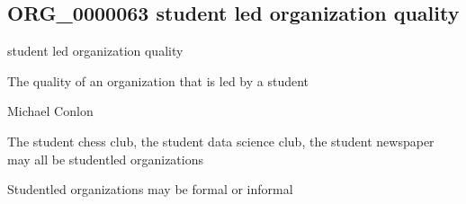 \documentclass[letterpaper,10pt,english]{sphinxmanual}
\begin{document}
\subsection{ORG\_0000063 \sphinxhyphen{} student led organization quality}
\label{\detokenize{doc-ORG_0000063:org-0000063-student-led-organization-quality}}\label{\detokenize{doc-ORG_0000063:index-0}}\label{\detokenize{doc-ORG_0000063::doc}}
\begin{sphinxShadowBox}

\sphinxAtStartPar
student led organization quality
\end{sphinxShadowBox}

\begin{sphinxShadowBox}

\sphinxAtStartPar
{\hyperref[\detokenize{doc-BFO_0000019::doc}]{}}
\end{sphinxShadowBox}

\begin{sphinxShadowBox}

\sphinxAtStartPar
The quality of an organization that is led by a student
\end{sphinxShadowBox}

\begin{sphinxShadowBox}

\sphinxAtStartPar
Michael Conlon 
\end{sphinxShadowBox}

\begin{sphinxShadowBox}

\sphinxAtStartPar
The student chess club, the student data science club, the student newspaper may all be student\sphinxhyphen{}led organizations
\end{sphinxShadowBox}

\begin{sphinxShadowBox}

\sphinxAtStartPar
Student\sphinxhyphen{}led organizations may be formal or informal
\end{sphinxShadowBox}

\begin{sphinxShadowBox}

\sphinxAtStartPar
{}
\end{sphinxShadowBox}
\end{document}

